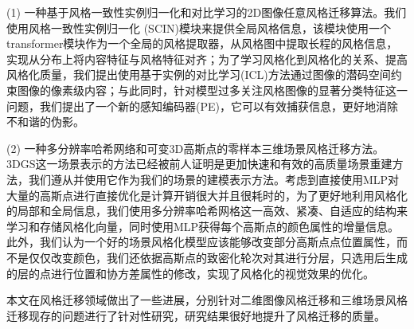 \par (1)  一种基于风格一致性实例归一化和对比学习的2D图像任意风格迁移算法。我们使用风格一致性实例归一化 (SCIN)模块来提供全局风格信息，该模块使用一个transformer模块作为一个全局的风格提取器，从风格图中提取长程的风格信息，实现从分布上将内容特征与风格特征对齐；为了学习风格化到风格化的关系、提高风格化质量，我们提出使用基于实例的对比学习(ICL)方法通过图像的潜码空间约束图像的像素级内容；与此同时，针对模型过多关注风格图像的显著分类特征这一问题，我们提出了一个新的感知编码器(PE)，它可以有效捕获信息，更好地消除不和谐的伪影。   
\par (2)  一种多分辨率哈希网络和可变3D高斯点的零样本三维场景风格迁移方法。3DGS这一场景表示的方法已经被前人证明是更加快速和有效的高质量场景重建方法，我们遵从并使用它作为我们的场景的建模表示方法。考虑到直接使用MLP对大量的高斯点进行直接优化是计算开销很大并且很耗时的，为了更好地利用风格化的局部和全局信息，我们使用多分辨率哈希网格这一高效、紧凑、自适应的结构来学习和存储风格化向量，同时使用MLP获得每个高斯点的颜色属性的增量信息。此外，我们认为一个好的场景风格化模型应该能够改变部分高斯点点位置属性，而不是仅仅改变颜色，我们还依据高斯点的致密化轮次对其进行分层，只选用后生成的层的点进行位置和协方差属性的修改，实现了风格化的视觉效果的优化。

\par 本文在风格迁移领域做出了一些进展，分别针对二维图像风格迁移和三维场景风格迁移现存的问题进行了针对性研究，研究结果很好地提升了风格迁移的质量。
